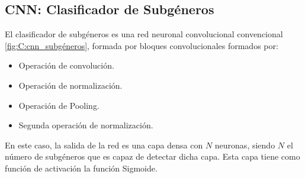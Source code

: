 \subsection{CNN: Clasificador de Subgéneros}\label{c:clas_subg}

El clasificador de subgéneros es una red neuronal convolucional convencional \ref{fig:C:cnn_subgéneros}, formada por bloques convolucionales formados por:

\begin{itemize}
    \item Operación de convolución.
    \item Operación de normalización.
    \item Operación de Pooling.
    \item Segunda operación de normalización.
\end{itemize}

En este caso, la salida de la red es una capa densa con $N$ neuronas, siendo $N$ el número de subgéneros que es capaz de detectar dicha capa. Esta capa tiene como función de activación la función Sigmoide. 

